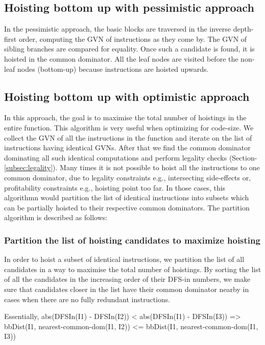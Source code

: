 \documentclass{sig-alternate}
\begin{document}
\subsection{Hoisting bottom up with pessimistic approach}
\label{subsec:pessimistic}
In the pessimistic approach, the basic blocks are traversed in the inverse
depth-first order, computing the GVN of instructions as they come by. The GVN of
sibling branches are compared for equality. Once such a candidate is found, it
is hoisted in the common dominator. All the leaf nodes are visited before the
non-leaf nodes (bottom-up) because instructions are hoisted upwards.

\subsection{Hoisting bottom up with optimistic approach}
\label{subsec:optimistic}
In this approach, the goal is to maximise the total number of hoistings in the
entire function.  This algorithm is very useful when optimizing for code-size.
We collect the GVN of all the instructions in the function and iterate on the
list of instructions having identical GVNs. After that we find the common
dominator dominating all such identical computations and perform legality checks
(Section-\ref{subsec:legality}). Many times it is not possible to hoist all the
instructions to one common dominator, due to legality constraints e.g.,
intersecting side-effects or, profitability constraints e.g., hoisting point too
far. In those cases, this algorithmn would partition the list of identical
instructions into subsets which can be partially hoisted to their respective
common dominators. The partition algorithm is described as follows:

\subsubsection{Partition the list of hoisting candidates to maximize hoisting}
\label{subsec:partition}
In order to hoist a subset of identical instructions, we partition the list of
all candidates in a way to maximise the total number of hoistings.  By sorting
the list of all the candidates in the increasing order of their DFS-in numbers,
we make sure that candidates closer in the list have their common dominator
nearby in cases when there are no fully redundant instructions.

Essentially,
abs(DFSIn(I1) - DFSIn(I2)) < abs(DFSIn(I1) - DFSIn(I3))
=> bbDist(I1, nearest-common-dom(I1, I2)) <= bbDist(I1, nearest-common-dom(I1, I3))
\end{document}
